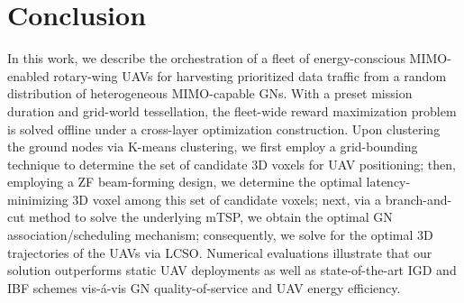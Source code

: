 \documentclass[10pt, twocolumn]{IEEEtran}
\begin{document}
\section{Conclusion}\label{S5}
In this work, we describe the orchestration of a fleet of energy-conscious MIMO-enabled rotary-wing UAVs for harvesting prioritized data traffic from a random distribution of heterogeneous MIMO-capable GNs. With a preset mission duration and grid-world tessellation, the fleet-wide reward maximization problem is solved offline under a cross-layer optimization construction. Upon clustering the ground nodes via K-means clustering, we first employ a grid-bounding technique to determine the set of candidate $3$D voxels for UAV positioning; then, employing a ZF beam-forming design, we determine the optimal latency-minimizing $3$D voxel among this set of candidate voxels; next, via a branch-and-cut method to solve the underlying mTSP, we obtain the optimal GN association/scheduling mechanism; consequently, we solve for the optimal $3$D trajectories of the UAVs via LCSO. Numerical evaluations illustrate that our solution outperforms static UAV deployments as well as state-of-the-art IGD and IBF schemes vis-\'{a}-vis GN quality-of-service and UAV energy efficiency.
\vspace{-3mm}



\end{document}
